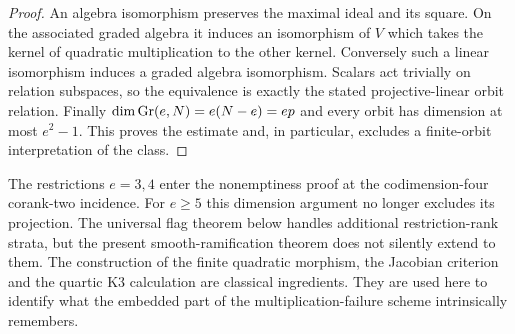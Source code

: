 \begin{proof}
An algebra isomorphism preserves the maximal ideal and its square.
On the associated graded algebra it induces an isomorphism of $V$
which takes the kernel of quadratic multiplication to the other
kernel. Conversely such a linear isomorphism induces a graded
algebra isomorphism. Scalars act trivially on relation subspaces,
so the equivalence is exactly the stated projective-linear orbit
relation. Finally $\dim\operatorname{Gr}(e,N)=e(N-e)=ep$ and every orbit has
dimension at most $e^2-1$. This proves the estimate and, in
particular, excludes a finite-orbit interpretation of the class.
\end{proof}

\begin{remark}\label{rem:ramification-scope}
The restrictions $e=3,4$ enter the nonemptiness proof at the
codimension-four corank-two incidence. For $e\ge5$ this dimension
argument no longer excludes its projection. The universal flag theorem
below handles additional restriction-rank strata, but the present
smooth-ramification theorem does not silently extend to them.
The construction of the finite quadratic morphism, the Jacobian
criterion and the quartic K3 calculation are classical ingredients.
They are used here to identify what the embedded part of the
multiplication-failure scheme intrinsically remembers.
\end{remark}
